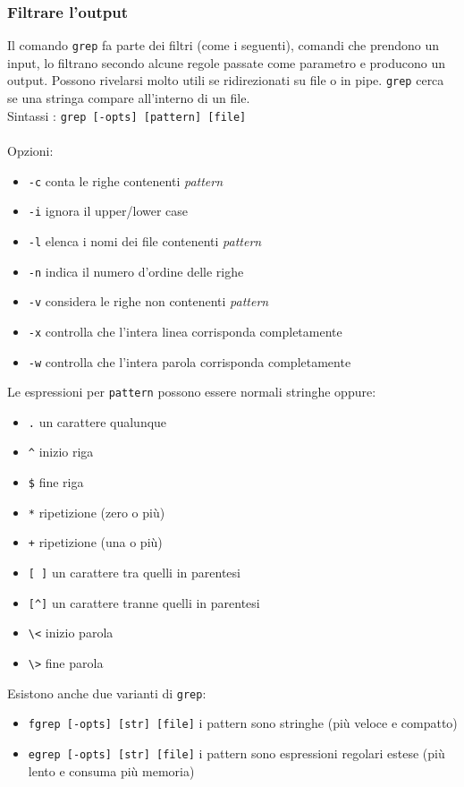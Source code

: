 \documentclass[a4paper]{article}
\begin{document}
\subsubsection{Filtrare l'output} Il comando \verb|grep| fa parte dei filtri (come i seguenti), comandi che prendono un input, lo filtrano secondo alcune regole passate come parametro e producono un output. Possono rivelarsi molto utili se ridirezionati su file o in pipe. \verb|grep| cerca se una stringa compare all'interno di un file. \\
Sintassi : \verb|grep [-opts] [pattern] [file]| \\ \\
Opzioni:
\begin{itemize}
\item \verb|-c| conta le righe contenenti \textit{pattern}
\item \verb|-i| ignora il upper/lower case
\item \verb|-l| elenca i nomi dei file contenenti \textit{pattern}
\item \verb|-n| indica il numero d'ordine delle righe
\item \verb|-v| considera le righe non contenenti \textit{pattern}
\item \verb|-x| controlla che l'intera linea corrisponda completamente
\item \verb|-w| controlla che l'intera parola corrisponda completamente
\end{itemize}
Le espressioni per \verb|pattern| possono essere normali stringhe oppure:\begin{itemize}
\item \verb|.| un carattere qualunque
\item \verb|^| inizio riga
\item \verb|$| fine riga
\item \verb|*| ripetizione (zero o più) 
\item \verb|+| ripetizione (una o più)
\item \verb|[ ]| un carattere tra quelli in parentesi
\item \verb|[^]| un carattere tranne quelli in parentesi
\item \verb|\<| inizio parola
\item \verb|\>| fine parola
\end{itemize}
Esistono anche due varianti di \verb|grep|:
\begin{itemize}
\item \verb|fgrep [-opts] [str] [file]| i pattern sono stringhe (più veloce e compatto)
\item \verb|egrep [-opts] [str] [file]| i pattern sono espressioni regolari estese (più lento e consuma più memoria)
\end{itemize}
\end{document}
